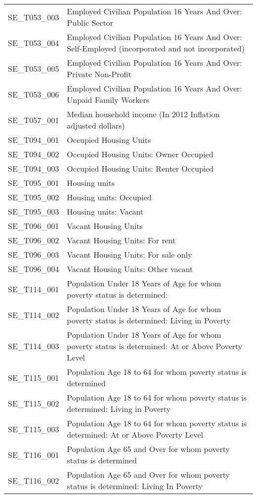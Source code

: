 \begin{longtable}{rp{5in}}
  SE\_T053\_003 & Employed Civilian Population 16 Years And Over: Public Sector \\ 
  SE\_T053\_004 & Employed Civilian Population 16 Years And Over: Self-Employed (incorporated and not incorporated) \\ 
  SE\_T053\_005 & Employed Civilian Population 16 Years And Over: Private Non-Profit \\ 
  SE\_T053\_006 & Employed Civilian Population 16 Years And Over: Unpaid Family Workers \\ 
  SE\_T057\_001 & Median household income (In 2012 Inflation adjusted dollars) \\ 
  SE\_T094\_001 & Occupied Housing Units \\ 
  SE\_T094\_002 & Occupied Housing Units: Owner Occupied \\ 
  SE\_T094\_003 & Occupied Housing Units: Renter Occupied \\ 
  SE\_T095\_001 & Housing units \\ 
  SE\_T095\_002 & Housing units: Occupied \\ 
  SE\_T095\_003 & Housing units: Vacant \\ 
  SE\_T096\_001 & Vacant Housing Units \\ 
  SE\_T096\_002 & Vacant Housing Units: For rent \\ 
  SE\_T096\_003 & Vacant Housing Units: For sale only \\ 
  SE\_T096\_004 & Vacant Housing Units: Other vacant \\ 
  SE\_T114\_001 & Population Under 18 Years of Age for whom poverty status is determined: \\ 
  SE\_T114\_002 & Population Under 18 Years of Age for whom poverty status is determined: Living in Poverty \\ 
  SE\_T114\_003 & Population Under 18 Years of Age for whom poverty status is determined: At or Above Poverty Level \\ 
  SE\_T115\_001 & Population Age 18 to 64 for whom poverty status is determined \\ 
  SE\_T115\_002 & Population Age 18 to 64 for whom poverty status is determined: Living in Poverty \\ 
  SE\_T115\_003 & Population Age 18 to 64 for whom poverty status is determined: At or Above Poverty Level \\ 
  SE\_T116\_001 & Population Age 65 and Over for whom poverty status is determined \\ 
  SE\_T116\_002 & Population Age 65 and Over for whom poverty status is determined: Living In Poverty \\ 

\end{longtable}

